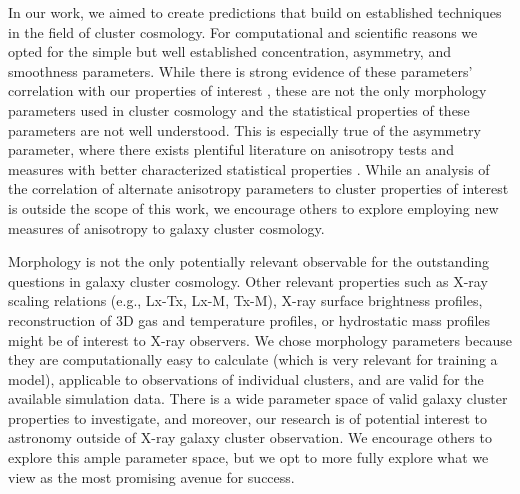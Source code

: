 \documentclass[twocolumn, 11pt]{aastex63}%
\begin{document}
In our work, we aimed to create predictions that build on established techniques in the field of cluster cosmology. For computational and scientific reasons we opted for the simple but well established concentration, asymmetry, and smoothness parameters. While there is strong evidence of these parameters' correlation with our properties of interest \citep[e.g.,][]{Rasia_2013, Parekh_2015, Lovisari_2017, Green_2019}, these are not the only morphology parameters used in cluster cosmology and the statistical properties of these parameters are not well understood. This is especially true of the asymmetry parameter, where there exists plentiful literature on anisotropy tests and measures with better characterized statistical properties \citep[for examples and reviews of this topic see][]{mardia2000directional, feigelson2012modern, pewsey2013circular, baddeley2015spatial, RAJALA2018141}. While an analysis of the correlation of alternate anisotropy parameters to cluster properties of interest is outside the scope of this work, we encourage others to explore employing new measures of anisotropy to galaxy cluster cosmology.

Morphology is not the only potentially relevant observable for the outstanding questions in galaxy cluster cosmology. Other relevant properties such as X-ray scaling relations (e.g., Lx-Tx, Lx-M, Tx-M), X-ray surface brightness profiles, reconstruction of 3D gas and temperature profiles, or hydrostatic mass profiles might be of interest to X-ray observers. We chose morphology parameters because they are computationally easy to calculate (which is very relevant for training a model), applicable to observations of individual clusters, and are valid for the available simulation data. There is a wide parameter space of valid galaxy cluster properties to investigate, and moreover, our research is of potential interest to astronomy outside of X-ray galaxy cluster observation. We encourage others to explore this ample parameter space, but we opt to more fully explore what we view as the most promising avenue for success.
\end{document}
